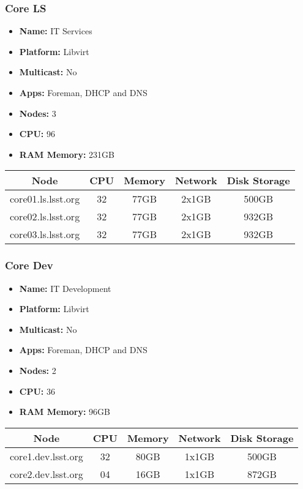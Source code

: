 \subsubsection{Core LS}
\begin{itemize}
  \itemsep0em 
  \item \textbf{Name:}      IT Services
  \item \textbf{Platform:}        Libvirt
  \item \textbf{Multicast:}  No
  \item \textbf{Apps:}       Foreman, DHCP and DNS
  \item \textbf{Nodes:}      3
  \item \textbf{CPU:}        96
  \item \textbf{RAM Memory:} 231GB
\end{itemize}
\begin{center}
  \small
  \begin{tabular}{||c c c c c||} 
    \hline
    \textbf{Node} & \textbf{CPU} & \textbf{Memory} & \textbf{Network} & \textbf{Disk Storage} \\ [0.5ex]
    \hline
    core01.ls.lsst.org & 32 & 77GB & 2x1GB & 500GB \\
    \hline
    core02.ls.lsst.org & 32 & 77GB & 2x1GB & 932GB \\
    \hline
    core03.ls.lsst.org & 32 & 77GB & 2x1GB & 932GB \\
    \hline
  \end{tabular}
\end{center}

\subsubsection{Core Dev}
\begin{itemize}
  \itemsep0em 
  \item \textbf{Name:}       IT Development
  \item \textbf{Platform:}   Libvirt
  \item \textbf{Multicast:}  No
  \item \textbf{Apps:}       Foreman, DHCP and DNS
  \item \textbf{Nodes:}      2
  \item \textbf{CPU:}        36
  \item \textbf{RAM Memory:} 96GB
\end{itemize}
\begin{center}
  \small
  \begin{tabular}{||c c c c c||}
    \hline
    \textbf{Node} & \textbf{CPU} & \textbf{Memory} & \textbf{Network} & \textbf{Disk Storage} \\ [0.5ex]
    \hline
    core1.dev.lsst.org & 32 & 80GB & 1x1GB & 500GB \\
    \hline
    core2.dev.lsst.org & 04 & 16GB & 1x1GB & 872GB \\
    \hline
  \end{tabular}
\end{center}


